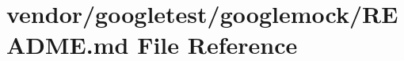 \hypertarget{vendor_2googletest_2googlemock_2README_8md}{}\section{vendor/googletest/googlemock/\+R\+E\+A\+D\+ME.md File Reference}
\label{vendor_2googletest_2googlemock_2README_8md}
